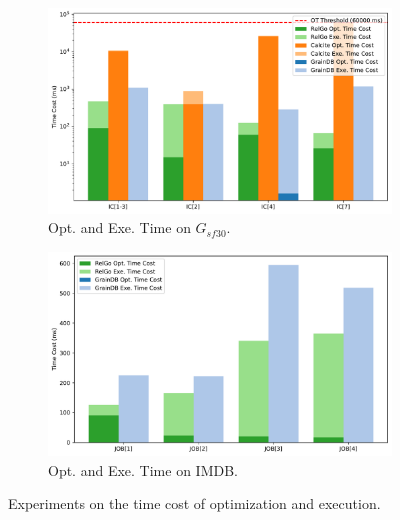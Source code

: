 \begin{figure}[ht]
    \centering
    \begin{subfigure}[b]{0.45\linewidth}
        \centering
        \includegraphics[width=\linewidth]{./figures/exp/opt_exe_ldbc.pdf}
        \caption{Opt. and Exe. Time on $G_{sf30}$.}
        \label{fig:exp-opt-ldbc}
    \end{subfigure}
    \begin{subfigure}[b]{0.45\linewidth}
        \centering
        \includegraphics[width=\linewidth]{./figures/exp/opt_exe_job.pdf}
        \caption{Opt. and Exe. Time on IMDB.}
        \label{fig:exp-opt-job}
    \end{subfigure}
    \caption{Experiments on the time cost of optimization and execution.}
    \label{fig:exp-optimization}
\end{figure}


